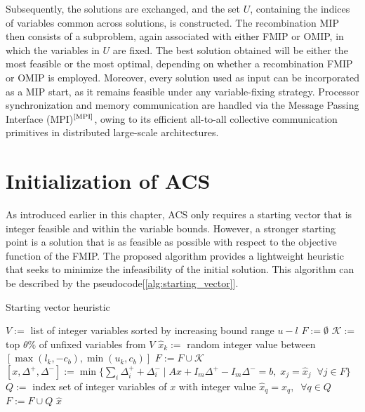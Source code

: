Subsequently, the solutions are exchanged, and the set $U$, containing the indices of variables common across solutions, is constructed. The recombination MIP then consists of a subproblem, again associated with either FMIP or OMIP, in which the variables in $U$ are fixed.
The best solution obtained will be either the most feasible or the most optimal, depending on whether a recombination FMIP or OMIP is employed. Moreover, every solution used as input can be incorporated as a MIP start, as it remains feasible under any variable-fixing strategy.
Processor synchronization and memory communication are handled via the Message Passing Interface (MPI)$^\text{\cite{MPI}}$, owing to its efficient all-to-all collective communication primitives in distributed large-scale architectures.

\section{Initialization of ACS}
As introduced earlier in this chapter, ACS only requires a starting vector that is integer feasible and within the variable bounds. However, a stronger starting point is a solution that is as feasible as possible with respect to the objective function of the FMIP.
The proposed algorithm provides a lightweight heuristic that seeks to minimize the infeasibility of the initial solution. This algorithm can be described by the pseudocode[\ref{alg:starting_vector}].
\begin{algorithm}
\caption{Starting vector heuristic}\label{alg:starting_vector}
\begin{algorithmic}[1]
\State $V :=$ list of integer variables sorted by increasing bound range $u-l$
\State $F := \emptyset$
    \State $\mathcal{K} :=$ top $\theta \%$ of unfixed variables from $V$
        \State $\hat{x}_k :=$ random integer value between $[\max(l_k, -c_b), \min(u_k, c_b)]$
    \EndFor
    \State $F := F \cup \mathcal{K}$
    \State $[x, \Delta^+, \Delta^-] := \min\{\sum_i \Delta_i^+ + \Delta_i^- \mid A x + I_m \Delta^+ - I_m \Delta^- = b, \; x_j = \hat{x}_j \;\; \forall j \in F\}$
    \State $Q :=$ index set of integer variables of $x$ with integer value
    \State $\hat{x}_q = x_q, \;\; \forall q \in Q$
    \State $F := F \cup Q$
\EndWhile
\State \Return $\hat{x}$
\end{algorithmic}
\end{algorithm}
